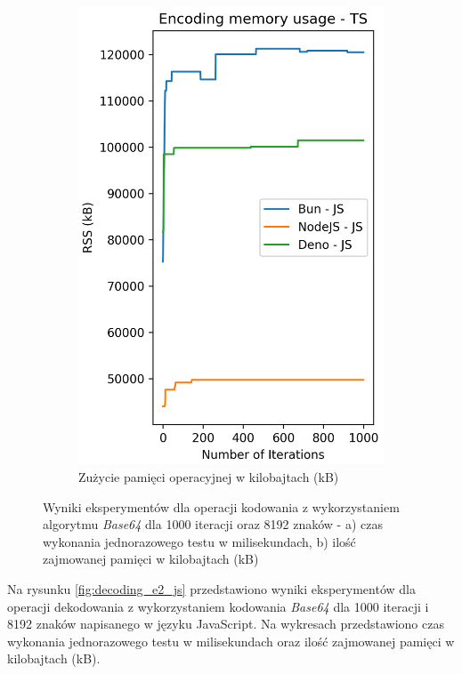 \begin{figure}[H]
\begin{subfigure}[b]{0.42\textwidth}
    \includegraphics[width=\textwidth]{Figures/coding/base64_1000_encoding_js_memory.png}
    \caption{Zużycie pamięci operacyjnej w kilobajtach (kB)}
    \label{fig:encoding_e2_js_memory}
  \end{subfigure}
  \hfill
  \caption{Wyniki eksperymentów dla operacji kodowania z wykorzystaniem algorytmu \textit{Base64} dla 1000 iteracji oraz 8192 znaków - a) czas wykonania jednorazowego testu w milisekundach, b) ilość zajmowanej pamięci w kilobajtach (kB)}
  \label{fig:encoding_e2_js}
\end{figure}

Na rysunku \ref{fig:decoding_e2_js} przedstawiono wyniki eksperymentów dla operacji dekodowania z wykorzystaniem kodowania \textit{Base64} dla 1000 iteracji i 8192 znaków napisanego w języku JavaScript. Na wykresach przedstawiono czas wykonania jednorazowego testu w milisekundach oraz ilość zajmowanej pamięci w kilobajtach (kB).

